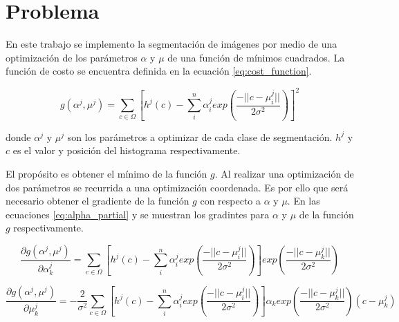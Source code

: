 \section*{Problema}

En este trabajo se implemento la segmentación de imágenes por medio de una optimización de los parámetros $\alpha$ y $\mu$ de una función de mínimos cuadrados. La función de costo se encuentra definida en la ecuación \ref{eq:cost_function}.

\begin{equation}
    g(\alpha^j,\mu^j) = \sum_{c\in \Omega}\left[  h^j(c) - \sum_i^n \alpha^j_i exp\left(\frac{-||c-\mu_i^j||}{2\sigma^2} \right)\right]^2 \label{eq:cost_function}
\end{equation}

donde $\alpha^j$ y $\mu^j$ son los parámetros a optimizar de cada clase de segmentación. $h^j$ y $c$ es el valor y posición del histograma respectivamente.

El propósito es obtener el mínimo de la función $g$. Al realizar una optimización de dos parámetros se recurrida a una optimización coordenada. Es por ello que será necesario obtener el gradiente de la función $g$ con respecto a $\alpha$ y $\mu$. En las ecuaciones \ref{eq:alpha_partial} y se muestran los gradintes para $\alpha$ y $\mu$ de la función $g$ respectivamente.

\begin{equation}
    \frac{\partial g(\alpha^j,\mu^j)}{\partial \alpha^j_k} =  \sum_{c\in \Omega}\left[  h^j(c) - \sum_i^n \alpha^j_i exp\left(\frac{-||c-\mu_i^j||}{2\sigma^2} \right)\right] exp\left( \frac{-||c-\mu_k^j||}{2\sigma^2} \right)
    \label{eq:alpha_partial}
\end{equation}

\begin{equation}
    \frac{\partial g(\alpha^j,\mu^j)}{\partial \mu^j_k} = -\frac{2}{\sigma^2}\sum_{c\in \Omega}\left[  h^j(c) - \sum_i^n \alpha^j_i exp\left(\frac{-||c-\mu_i^j||}{2\sigma^2} \right)\right] \alpha_k exp\left( \frac{-||c-\mu_k^j||}{2\sigma^2} \right) (c-\mu_k^j)
\end{equation}
